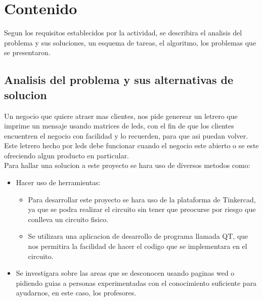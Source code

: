\documentclass{article}
\begin{document}
\newpage

\section{Contenido} \label{contenido}
Segun los requisitos establecidos por la actividad, se describira el analisis del problema y sus soluciones, un esquema de tareas, el algoritmo, los problemas que se presentaron. 

\subsection{Analisis del problema y sus alternativas de solucion}
Un negocio que quiere atraer mas clientes, nos pide generear un letrero que imprime un mensaje usando matrices de leds, con el fin de que los clientes encuentren el negocio con facilidad y lo recuerden, para que asi puedan volver. Este letrero hecho por leds debe funcionar cuando el negocio este abierto o se este ofreciendo algun producto en particular.\\

Para hallar una solucion a este proyecto se hara uso de diversos metodos como:
\begin{itemize}
    \item Hacer uso de herramientas:
    \begin{itemize}
        \item Para desarrollar este proyecto se hara uso de la plataforma de Tinkercad, ya que se podra realizar el circuito sin tener que preocurse por riesgo que conlleva un circuito fisico.
    \item Se utilizara una aplicacion de desarrollo de programa llamada QT, que nos permitira la facilidad de hacer el codigo que se implementara en el circuito.
    \end{itemize}
    \item Se investigara sobre las areas que se desconocen usando paginas wed o pidiendo guias a personas experimentadas con el conocimiento suficiente para ayudarnos, en este caso, los profesores.
\end{itemize}
\end{document}
